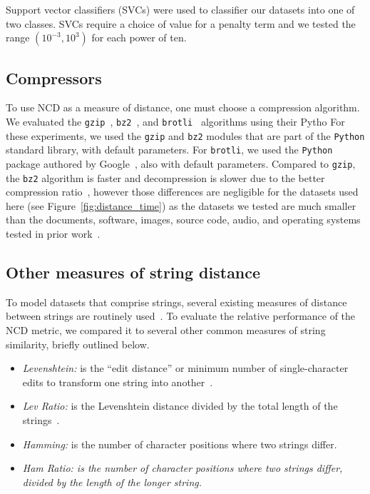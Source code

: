 \documentclass[preprint,12pt]{article}
\begin{document}
Support vector classifiers (SVCs) were used to classifier our datasets into one of two classes.
SVCs require a choice of value for a penalty term and we tested the range $(10^{-3}, 10^3)$ for each power of ten.










\subsection{Compressors}
\label{compressors}

To use NCD as a measure of distance, one must choose a compression algorithm.
We evaluated the \texttt{gzip}~\cite{gzip}, \texttt{bz2}~\cite{bz2}, and \texttt{brotli}~\cite{brotli_package} algorithms using their Pytho
For these experiments, we used the \texttt{gzip} and \texttt{bz2} modules that are part of the \texttt{Python} standard library, with default parameters.
For \texttt{brotli}, we used the \texttt{Python} package authored by Google~\cite{brotli_package}, also with default parameters.
Compared to \texttt{gzip}, the \texttt{bz2} algorithm is faster and decompression is slower due to the better compression ratio~\cite{bz2_comparison}, however those differences are negligible for the datasets used here (see Figure~\ref{fig:distance_time}) as the datasets we tested are much smaller than the documents, software, images, source code, audio, and operating systems tested in prior work~\cite{bz2_comparison}.

\subsection{Other measures of string distance}
\label{string_metrics}
To model datasets that comprise strings, several existing measures of distance between strings are routinely used~\cite{levenshtein}.
To evaluate the relative performance of the NCD metric, we compared it to several other common measures of string similarity, briefly outlined below.
\begin{itemize}
    \item \textit{Levenshtein:} is the ``edit distance'' or minimum number of single-character edits to transform one string into another~\cite{navarro2001guided}.
    \item \textit{Lev Ratio:} is the Levenshtein distance divided by the total length of the strings~\cite{levenshtein}.
    \item \textit{Hamming:} is the number of character positions where two strings differ. 
    \item \textit{Ham Ratio: is the number of character positions where two strings differ, divided by the length of the longer string.}
\end{itemize}
\end{document}
